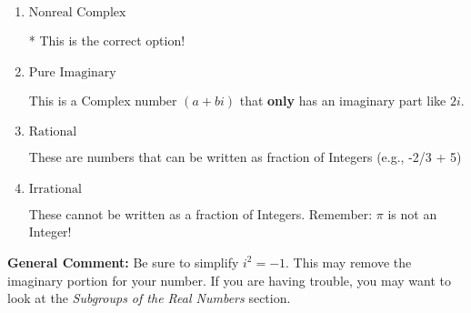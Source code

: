 \documentclass{extbook}[14pt]
\begin{document}
\begin{enumerate}
{\begin{enumerate}[label=\Alph*.]
This is not a number. The only non-Complex number we know is dividing by 0 as this is not a number!
\item \( \text{Nonreal Complex} \)

* This is the correct option!
\item \( \text{Pure Imaginary} \)

This is a Complex number $(a+bi)$ that \textbf{only} has an imaginary part like $2i$.
\item \( \text{Rational} \)

These are numbers that can be written as fraction of Integers (e.g., -2/3 + 5)
\item \( \text{Irrational} \)

These cannot be written as a fraction of Integers. Remember: $\pi$ is not an Integer!
\end{enumerate}

\textbf{General Comment:} Be sure to simplify $i^2 = -1$. This may remove the imaginary portion for your number. If you are having trouble, you may want to look at the \textit{Subgroups of the Real Numbers} section.
}
\end{enumerate}
\end{document}
